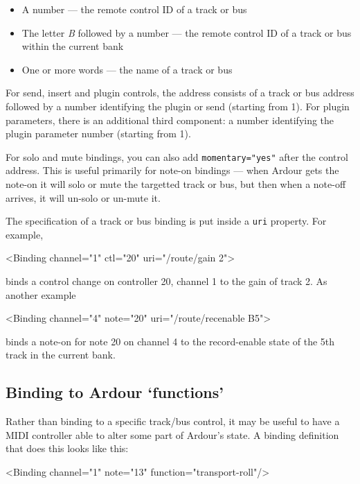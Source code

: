 \documentclass[10pt,a4paper]{book}
\begin{document}
\begin{itemize}
\item A number --- the remote control ID of a track or bus
\item The letter \emph{B} followed by a number --- the remote control ID of a track or bus within the current bank
\item One or more words --- the name of a track or bus
\end{itemize}

For send, insert and plugin controls, the address consists of a track
or bus address followed by a number identifying the plugin or send
(starting from 1).  For plugin parameters, there is an additional third
component: a number identifying the plugin parameter number (starting
from 1).

For solo and mute bindings, you can also add \texttt{momentary="yes"} after the
control address. This is useful primarily for note-on bindings --- when
Ardour gets the note-on it will solo or mute the targetted track or
bus, but then when a note-off arrives, it will un-solo or un-mute it.

The specification of a track or bus binding is put inside a \texttt{uri} property.  For example,

\begin{listing}
<Binding channel="1" ctl="20" uri="/route/gain 2">
\end{listing}

binds a control change on controller 20, channel 1 to the gain of track 2.  As another example

\begin{listing}
<Binding channel="4" note="20" uri="/route/recenable B5">
\end{listing}

binds a note-on for note 20 on channel 4 to the record-enable state of
the 5th track in the current bank.



\subsection{Binding to Ardour `functions'}

Rather than binding to a specific track/bus control, it may be useful
to have a MIDI controller able to alter some part of Ardour's state. A
binding definition that does this looks like this:

\begin{listing}
<Binding channel="1" note="13" function="transport-roll"/>
\end{listing}
\end{document}
